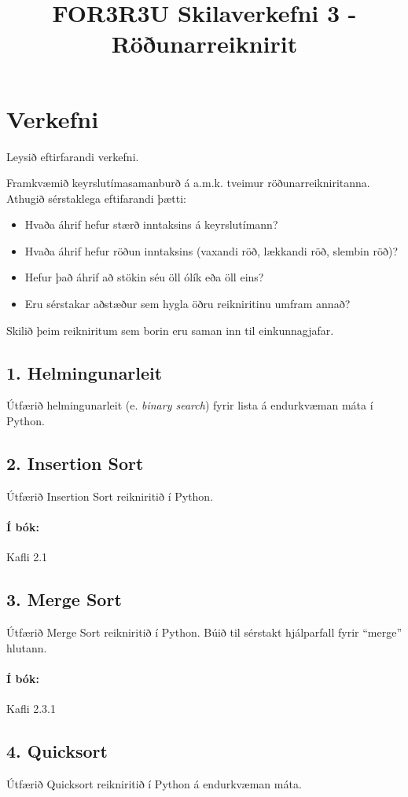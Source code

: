 \documentclass{article}
\title{FOR3R3U Skilaverkefni 3 - Röðunarreiknirit}
\begin{document}
\maketitle
\section{Verkefni}
Leysið eftirfarandi verkefni. 

Framkvæmið keyrslutímasamanburð á a.m.k. tveimur röðunarreikniritanna. Athugið sérstaklega eftifarandi þætti:
\begin{itemize}
 \item Hvaða áhrif hefur stærð inntaksins á keyrslutímann?
 \item Hvaða áhrif hefur röðun inntaksins (vaxandi röð, lækkandi röð, slembin röð)?
 \item Hefur það áhrif að stökin séu öll ólík eða öll eins?
 \item Eru sérstakar aðstæður sem hygla öðru reikniritinu umfram annað?
\end{itemize}
Skilið þeim reikniritum sem borin eru saman inn til einkunnagjafar.

\subsection{1. Helmingunarleit}
Útfærið helmingunarleit (e. \emph{binary search}) fyrir lista á endurkvæman máta í Python.
\subsection{2. Insertion Sort}
Útfærið Insertion Sort reikniritið í Python.

\paragraph{Í bók:} Kafli 2.1
\subsection{3. Merge Sort}
Útfærið Merge Sort reikniritið í Python. Búið til sérstakt hjálparfall fyrir ``merge'' hlutann.

\paragraph{Í bók:} Kafli 2.3.1

\newpage
\subsection{4. Quicksort}
Útfærið Quicksort reikniritið í Python á endurkvæman máta.
\end{document}
